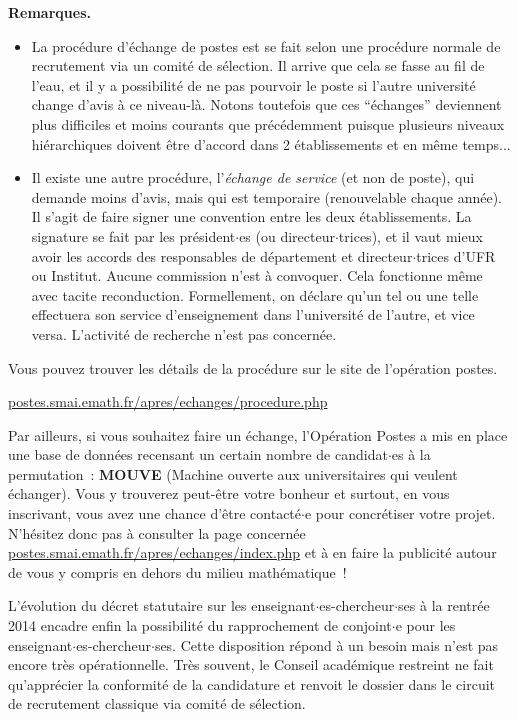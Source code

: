 {\bf Remarques.}
\begin{itemize}
\item La proc\'edure d'\'echange de postes est se fait selon une proc\'edure normale de recrutement via un comit\'e de sélection. Il arrive que cela se fasse au fil de l'eau, et il y a possibilit\'e de ne pas pourvoir le poste si l'autre universit\'e change d'avis \`a ce niveau-l\`a. Notons toutefois que ces ``\'echanges'' deviennent plus difficiles et moins courants que pr\'ec\'edemment puisque plusieurs niveaux hi\'erarchiques doivent \^etre d'accord dans 2 \'etablissements et en m\^eme temps...


\item Il existe une autre proc\'edure, l'{\em \'echange de service}
(et non de poste), qui demande moins d'avis, mais qui est temporaire
(renouvelable chaque ann\'ee).
Il s'agit de faire signer une convention entre les
deux \'etablissements. La signature se fait par les pr\'esident$\cdot$es (ou
directeur$\cdot$trices), et il vaut mieux avoir les accords des responsables de
d\'epartement et directeur$\cdot$trices d'UFR ou Institut. Aucune commission
n'est \`a convoquer. Cela fonctionne m\^eme avec tacite
reconduction. Formellement, on d\'eclare qu'un tel ou une telle effectuera son
service d'enseignement dans l'universit\'e de l'autre, et vice
versa. L'activit\'e de recherche n'est pas concern\'ee.
\end{itemize}

Vous pouvez trouver les d\'etails de la proc\'edure sur le site de
l'op\'eration postes. 

\url{postes.smai.emath.fr/apres/echanges/procedure.php}



Par ailleurs, si vous souhaitez faire un \'echange, l'Op\'eration
Postes a mis en place une base de donn\'ees recensant un certain
nombre de candidat$\cdot$es \`a la permutation~: \textbf{MOUVE} (Machine
ouverte aux universitaires qui veulent \'echanger). Vous y trouverez
peut-\^etre votre bonheur et surtout, en vous inscrivant, vous avez
une chance d'\^etre contact\'e$\cdot$e pour concr\'etiser votre projet.
N'h\'esitez donc pas \`a consulter la page concern\'ee
\url{postes.smai.emath.fr/apres/echanges/index.php}
et \`a en faire la publicit\'e autour de vous
y compris en dehors du milieu math\'ematique~!



L'\'evolution du d\'ecret statutaire sur les enseignant$\cdot$es-chercheur$\cdot$ses \`a la rentr\'ee 2014 
encadre enfin la possibilit\'e du rapprochement de conjoint$\cdot$e pour les enseignant$\cdot$es-chercheur$\cdot$ses. 
Cette disposition r\'epond \`a un besoin mais n'est pas encore tr\`es op\'erationnelle. 
Tr\`es souvent, le Conseil acad\'emique restreint ne
fait qu'appr\'ecier la conformit\'e de la candidature et renvoit le dossier dans le circuit de recrutement classique via comit\'e de s\'election.


